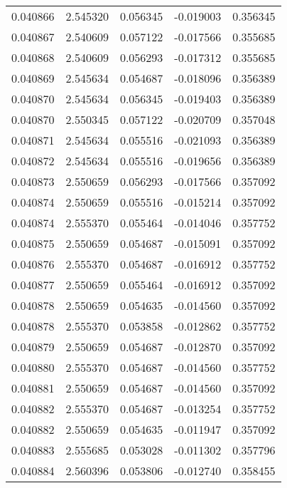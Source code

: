 \begin{tabular}{lrrrr}
0.040866    &  2.545320 &  0.056345 & -0.019003 &             0.356345 \\
0.040867    &  2.540609 &  0.057122 & -0.017566 &             0.355685 \\
0.040868    &  2.540609 &  0.056293 & -0.017312 &             0.355685 \\
0.040869    &  2.545634 &  0.054687 & -0.018096 &             0.356389 \\
0.040870    &  2.545634 &  0.056345 & -0.019403 &             0.356389 \\
0.040870    &  2.550345 &  0.057122 & -0.020709 &             0.357048 \\
0.040871    &  2.545634 &  0.055516 & -0.021093 &             0.356389 \\
0.040872    &  2.545634 &  0.055516 & -0.019656 &             0.356389 \\
0.040873    &  2.550659 &  0.056293 & -0.017566 &             0.357092 \\
0.040874    &  2.550659 &  0.055516 & -0.015214 &             0.357092 \\
0.040874    &  2.555370 &  0.055464 & -0.014046 &             0.357752 \\
0.040875    &  2.550659 &  0.054687 & -0.015091 &             0.357092 \\
0.040876    &  2.555370 &  0.054687 & -0.016912 &             0.357752 \\
0.040877    &  2.550659 &  0.055464 & -0.016912 &             0.357092 \\
0.040878    &  2.550659 &  0.054635 & -0.014560 &             0.357092 \\
0.040878    &  2.555370 &  0.053858 & -0.012862 &             0.357752 \\
0.040879    &  2.550659 &  0.054687 & -0.012870 &             0.357092 \\
0.040880    &  2.555370 &  0.054687 & -0.014560 &             0.357752 \\
0.040881    &  2.550659 &  0.054687 & -0.014560 &             0.357092 \\
0.040882    &  2.555370 &  0.054687 & -0.013254 &             0.357752 \\
0.040882    &  2.550659 &  0.054635 & -0.011947 &             0.357092 \\
0.040883    &  2.555685 &  0.053028 & -0.011302 &             0.357796 \\
0.040884    &  2.560396 &  0.053806 & -0.012740 &             0.358455 \\

\end{tabular}
